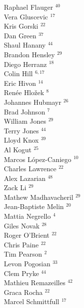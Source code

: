 \documentclass[PICOReport.tex]{subfiles}
\begin{document}
{\begin{multicols}{4}
Raphael Flauger $^{40}$                 \\
Vera Gluscevic $^{17}$                  \\
Kris Gorski $^{22}$                     \\
Dan Green $^{37}$                       \\
Shaul Hanany $^{44}$                    \\
Brandon Hensley $^{29}$                 \\
Diego Herranz $^{18}$                   \\
Colin Hill $^{6,17}$                      \\
Eric Hivon $^{14}$                      \\
Ren\'{e}e  Hlo\v{z}ek $^{8}$           \\
Johannes Hubmayr $^{26}$                \\
Brad Johnson $^{7}$                    \\
William Jones $^{29}$                   \\
Terry Jones $^{44}$                     \\
Lloyd Knox $^{39}$                      \\
Al Kogut $^{25}$                        \\
Marcos L\'{o}pez-Caniego $^{10}$        \\
Charles Lawrence $^{22}$                \\
Alex Lazarian $^{48}$                   \\
Zack Li $^{29}$                         \\
Mathew Madhavacheril $^{29}$            \\
Jean-Baptiste Melin $^{20}$             \\
Mattia Negrello $^{4}$                 \\
Giles Novak $^{28}$                     \\
Roger O'Brient $^{22}$                  \\
Chris Paine $^{22}$                     \\
Tim Pearson $^{2}$                     \\
Levon Pogosian $^{33}$                  \\
Clem Pryke $^{44}$                      \\
Mathieu Remazeilles $^{42}$             \\
Graca Rocha $^{22}$                     \\
Marcel Schmittfull $^{17}$              \\

\end{multicols}}
\end{document}
